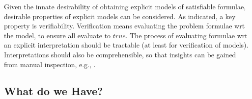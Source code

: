 \documentclass{easychair}
\begin{document}
Given the innate desirability of obtaining explicit models of satisfiable formulae, desirable
properties of explicit models can be considered.
As indicated, a key property is verifiability.
Verification means evaluating the problem formulae wrt the model, to ensure all evaluate to 
$true$.
The process of evaluating formulae wrt an explicit interpretation should be tractable (at least
for verification of models).
Interpretations should also be comprehensible, so that insights can be gained from manual 
inspection, e.g., \cite{EK+10}.

\subsection{What do we Have?}
\label{Have}
\end{document}
